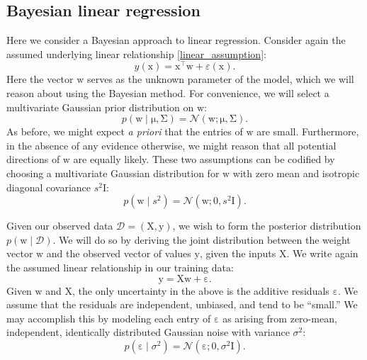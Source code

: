 \documentclass{article}
\newcommand{\given}{\mid}
\newcommand{\mc}[1]{\mathcal{#1}}
\newcommand{\data}{\mc{D}}
\newcommand{\trans}{^\top}
\newcommand{\mat}[1]{\bm{\mathrm{#1}}}
\renewcommand{\vec}[1]{\bm{\mathrm{#1}}}
\renewcommand{\epsilon}{\varepsilon}
\begin{document}
\subsection*{Bayesian linear regression}

Here we consider a Bayesian approach to linear regression. Consider
again the assumed underlying linear relationship \eqref{linear_assumption}:
\begin{equation*}
  y(\vec{x}) = \vec{x}\trans \vec{w} + \epsilon(\vec{x}).
\end{equation*}
Here the vector $\vec{w}$ serves as the unknown parameter of the
model, which we will reason about using the Bayesian method.  For
convenience, we will select a multivariate Gaussian prior distribution
on $\vec{w}$:
\begin{equation*}
  p(\vec{w} \given \vec{\mu}, \mat{\Sigma})
  =
  \mc{N}(\vec{w}; \vec{\mu}, \mat{\Sigma}).
\end{equation*}
As before, we might expect \emph{a priori} that the entries of
$\vec{w}$ are small.  Furthermore, in the absence of any evidence
otherwise, we might reason that all potential directions of $\vec{w}$
are equally likely.  These two assumptions can be codified by choosing
a multivariate Gaussian distribution for $\vec{w}$ with zero mean and
isotropic diagonal covariance $s^2 \mat{I}$:
\begin{equation}
  \label{simple_prior}
  p(\vec{w} \given s^2)
  =
  \mc{N}(\vec{w}; \vec{0}, s^2\mat{I}).
\end{equation}

Given our observed data $\data = (\mat{X}, \vec{y})$, we wish to form
the posterior distribution $p(\vec{w} \given \data)$.  We will do so
by deriving the joint distribution between the weight vector $\vec{w}$
and the observed vector of values $\vec{y}$, given the inputs
$\mat{X}$.  We write again the assumed linear relationship in our
training data:
\begin{equation*}
  \vec{y} = \mat{X}\vec{w} + \vec{\epsilon}.
\end{equation*}
Given $\vec{w}$ and $\mat{X}$, the only uncertainty in the above is
the additive residuals $\vec{\epsilon}$.  We assume that the residuals
are independent, unbiased, and tend to be ``small.''  We may
accomplish this by modeling each entry of $\vec{\epsilon}$ as arising
from zero-mean, independent, identically distributed Gaussian noise
with variance $\sigma^2$:
\begin{equation*}
  p(\vec{\epsilon} \given \sigma^2)
  =
  \mc{N}(\vec{\epsilon}; \vec{0}, \sigma^2 \mat{I}).
\end{equation*}
\end{document}
